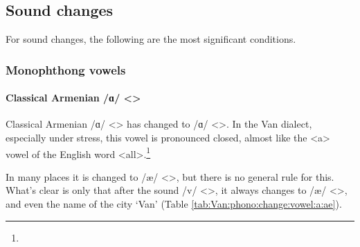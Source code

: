 \subsection{Sound changes}
For sound changes, the following are the most significant conditions. 


\begin{adjarianpage}\label{page:141}\end{adjarianpage}%

\subsubsection{Monophthong vowels}
\paragraph{Classical Armenian /ɑ/ <> }\label{sec:Van:phono:soundchange:monovowel:a}


Classical Armenian /ɑ/ <> has changed to /ɑ/ <>. In the Van dialect, especially under stress, this vowel is pronounced closed, almost like the <a> vowel of the English word <all>.\footnote{} 


In many places it is changed to /æ/ <>, but there is no general rule for this. What's clear is only that after the sound /v/ <>, it always changes to /æ/ <>, and even the name of the city `Van' (Table \ref{tab:Van:phono:change:vowel:a:ae}).

